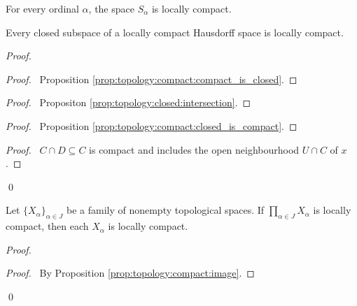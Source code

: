 \begin{cor}
For every ordinal $\alpha$, the space $S_\alpha$ is locally compact.
\end{cor}


\begin{thm}
  Every closed subspace of a locally compact Hausdorff space is locally
  compact.
\end{thm}

\begin{proof}
  \pf
  \begin{proof}
    \pf\ Proposition \ref{prop:topology:compact:compact_is_closed}.
  \end{proof}
  \begin{proof}
    \pf\ Propositon \ref{prop:topology:closed:intersection}.
  \end{proof}
  \begin{proof}
    \pf\ Proposition \ref{prop:topology:compact:closed_is_compact}.
  \end{proof}
  \qedstep
  \begin{proof}
    \pf\ $C \cap D \subseteq C$ is compact and includes the open
    neighbourhood
    $U \cap C$ of $x$.
  \end{proof}
  \qed
\end{proof}

 \begin{prop}
 Let $\{X_\alpha\}_{\alpha \in J}$ be a family of nonempty topological
spaces. If    $\prod_{\alpha \in J} X_\alpha$ is locally compact, then each
$X_\alpha$ is locally compact.
\end{prop}

\begin{proof}
\pf
{}
\begin{proof}
  \pf\ By Proposition \ref{prop:topology:compact:image}.
\end{proof}
\qed
\end{proof}

